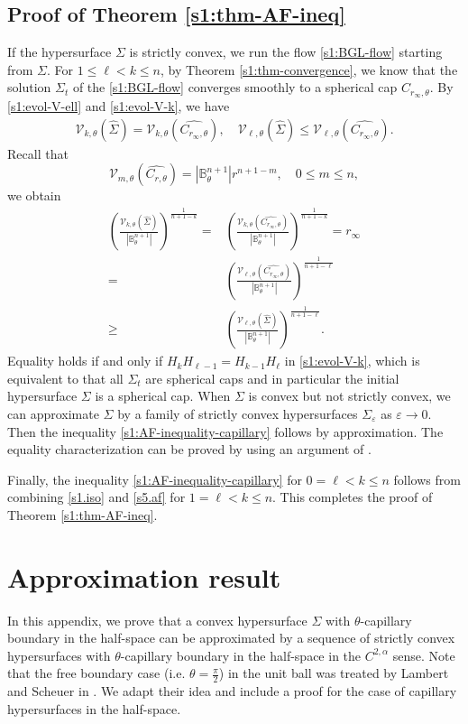 \documentclass[11pt,reqno]{amsart}
\theoremstyle{definition}
\theoremstyle{remark}
\numberwithin{equation}{section}
\renewcommand{\(}{\left(}
\renewcommand{\)}{\right)}
\renewcommand{\-}{\overline}
\renewcommand{\t}{\theta}
\begin{document}
\subsection{Proof of  Theorem \ref{s1:thm-AF-ineq}}\label{sec:7}
     If the hypersurface $\Sigma$ is strictly convex, we run the flow \eqref{s1:BGL-flow} starting from $\Sigma$. For $1\leq \ell<k\leq n$, by Theorem \ref{s1:thm-convergence}, we know that the solution $\Sigma_t$ of the \eqref{s1:BGL-flow} converges smoothly to a spherical cap $C_{r_\infty,\t}$. By \eqref{s1:evol-V-ell} and \eqref{s1:evol-V-k}, we have
      \begin{align*}
      \mathcal{V}_{k,\t}(\widehat{\Sigma})=\mathcal{V}_{k,\t}(\widehat{C_{r_\infty,\t}}), \quad
      \mathcal{V}_{\ell,\t}(\widehat{\Sigma})\leq \mathcal{V}_{\ell,\t}(\widehat{C_{r_\infty,\t}}).
      \end{align*}
      Recall that
      $$
      \mathcal{V}_{m,\t}(\widehat{C_{r,\t}})=|\mathbb B_\t^{n+1}|r^{n+1-m}, \quad 0\leq m\leq n,
	  $$
	  we obtain
	  \begin{align}
	  \(\frac{\mathcal{V}_{k,\t}(\widehat{\Sigma})}{|\mathbb B_\t^{n+1}|}\)^\frac{1}{n+1-k}= & \(\frac{\mathcal{V}_{k,\t}(\widehat{C_{r_\infty,\t}})}{|\mathbb B_\t^{n+1}|}\)^\frac{1}{n+1-k}=r_\infty\nonumber\\
	  =&\(\frac{\mathcal{V}_{\ell,\t}(\widehat{C_{r_\infty,\t}})}{|\mathbb B_\t^{n+1}|}\)^\frac{1}{n+1-\ell}\nonumber\\
\geq &\(\frac{\mathcal{V}_{\ell,\t}(\widehat{\Sigma})}{|\mathbb B_\t^{n+1}|}\)^\frac{1}{n+1-\ell}.\label{s5.af}
	  \end{align}
	  Equality holds if and only if $H_kH_{\ell-1}=H_{k-1}H_{\ell}$ in \eqref{s1:evol-V-k}, which is equivalent to that all $\Sigma_t$ are spherical caps and in particular the initial hypersurface $\Sigma$ is a spherical cap. When $\Sigma$ is convex but not strictly convex, we can approximate $\Sigma$ by a family of strictly convex hypersurfaces $\Sigma_\varepsilon$ as $\varepsilon\to 0$. Then the inequality \eqref{s1:AF-inequality-capillary} follows by approximation. The equality characterization can be proved by using an argument of \cite{GL09}.

Finally, the inequality \eqref{s1:AF-inequality-capillary} for $0=\ell<k\leq n$ follows from combining \eqref{s1.iso} and \eqref{s5.af} for $1=\ell<k\leq n$.  This completes the proof of Theorem \ref{s1:thm-AF-ineq}.


\appendix
\section{Approximation result}
In this appendix, we prove that a convex hypersurface $\Sigma$ with $\theta$-capillary boundary in the half-space can be approximated by a sequence of strictly convex hypersurfaces with $\theta$-capillary boundary in the half-space in the $C^{2,\alpha}$ sense. Note that the free boundary case (i.e. $\theta=\frac{\pi}{2}$) in the unit ball was treated by Lambert and Scheuer in \cite{Lambert-Scheuer2017}. We adapt their idea and include a proof for the case of capillary hypersurfaces in the half-space.
	
\end{document}
